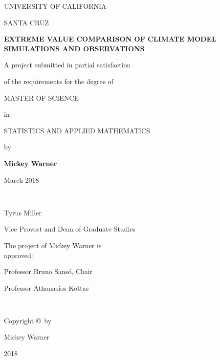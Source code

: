 \thispagestyle{empty} %

\singlespacing

\begin{center}
UNIVERSITY OF CALIFORNIA
\bigskip

SANTA CRUZ
\bigskip
\bigskip
\bigskip

\textbf{EXTREME VALUE COMPARISON OF CLIMATE MODEL SIMULATIONS AND OBSERVATIONS}
\bigskip
\bigskip
\bigskip

A project submitted in partial satisfaction

of the requirements for the degree of
\bigskip
\bigskip

MASTER OF SCIENCE
\bigskip

in
\bigskip

STATISTICS AND APPLIED MATHEMATICS
\bigskip
\bigskip

by
\bigskip
\bigskip

\textbf{Mickey Warner}
\bigskip

March 2018
\bigskip
\bigskip

\end{center}


\begin{multicols*}{2}

\ 

\bigskip
\bigskip
\bigskip
\bigskip
\bigskip
\bigskip
\bigskip
\bigskip
\bigskip
\bigskip
\bigskip
\bigskip
\bigskip
\bigskip
\bigskip
\bigskip
\bigskip


\hline
\bigskip
\noindent Tyrus Miller

\noindent Vice Provost and Dean of Graduate Studies



\noindent The project of Mickey Warner is\\approved:
\bigskip
\bigskip
\bigskip
\bigskip

\hline
\bigskip
\noindent Professor Bruno Sans{\'o}, Chair
\bigskip
\bigskip
\bigskip
\bigskip

\hline
\bigskip
\noindent Professor Athanasios Kottas


\end{multicols*}




\doublespacing

\newpage

\setcounter{page}{2}

\

\vfill
\begin{center}
Copyright \copyright~by

Mickey Warner

2018
\end{center}
\vfill

\

\newpage

\setcounter{page}{1}

